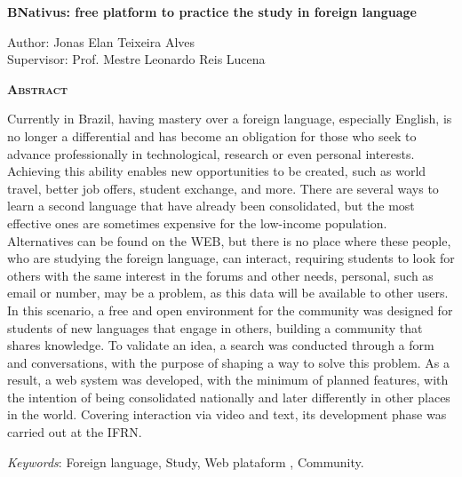 \begin{center}
	{\Large{\textbf{BNativus: free platform to practice the study in foreign language}}}
\end{center}

\vspace{1cm}

\begin{flushright}
	Author: Jonas Elan Teixeira Alves\\
	Supervisor: Prof. Mestre Leonardo Reis Lucena
\end{flushright}

\vspace{1cm}

\begin{center}
	\Large{\textsc{\textbf{Abstract}}}
\end{center}

\noindent Currently in Brazil, having mastery over a foreign language, especially English, is no longer a differential and has become an obligation for those who seek to advance professionally in technological, research or even personal interests. Achieving this ability enables new opportunities to be created, such as world travel, better job offers, student exchange, and more. There are several ways to learn a second language that have already been consolidated, but the most effective ones are sometimes expensive for the low-income population. Alternatives can be found on the WEB, but there is no place where these people, who are studying the foreign language, can interact, requiring students to look for others with the same interest in the forums and other needs, personal, such as email or number, may be a problem, as this data will be available to other users. In this scenario, a free and open environment for the community was designed for students of new languages that engage in others, building a community that shares knowledge. To validate an idea, a search was conducted through a form and conversations, with the purpose of shaping a way to solve this problem. As a result, a web system was developed, with the minimum of planned features, with the intention of being consolidated nationally and later differently in other places in the world. Covering interaction via video and text, its development phase was carried out at the IFRN.

\noindent\textit{Keywords}: Foreign language, Study, Web plataform , Community.